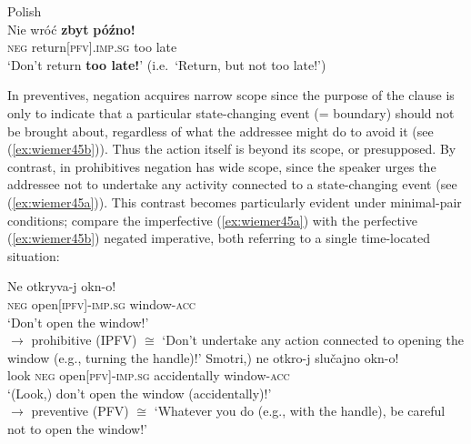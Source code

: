 \documentclass[output=paper,colorlinks,citecolor=brown]{langscibook}
\begin{document}
\ea \textnormal{Polish} \\
\label{ex:wiemer44}
\gll Nie wróć \textbf{zbyt} \textbf{późno!} \\
\textsc{neg} return\textsc{[pfv].imp.sg} too late \\
\glt `Don't return \textbf{too late!}' (i.e.\ `Return, but not too late!')
\z


 In preventives, negation acquires narrow scope since the purpose of the clause is only to indicate that a particular state-changing event (= boundary) should not be brought about, regardless of what the addressee might do to avoid it (see (\ref{ex:wiemer45b})). Thus the action itself is beyond its scope, or presupposed. By contrast, in prohibitives negation has wide scope, since the speaker urges the addressee not to undertake any activity connected to a state-changing event (see (\ref{ex:wiemer45a})). This contrast becomes particularly evident under minimal-pair conditions; compare the imperfective (\ref{ex:wiemer45a}) with the perfective (\ref{ex:wiemer45b}) negated imperative, both referring to a single time-located situation:



\ea \textnormal{}
\label{ex:wiemer45} 
\ea \label{ex:wiemer45a}
\gll Ne otkryva-j okn-o! \\
\textsc{neg} open\textsc{[ipfv]-imp.sg} window-\textsc{acc} \\
\glt `Don't open the window!' \\
$\rightarrow$ prohibitive (IPFV) ${\cong}$ `Don't undertake any action connected to opening the window (e.g., turning the handle)!'
\ex \label{ex:wiemer45b}
\gll {\op}Smotri\textnormal{,)} ne otkro-j {\op}slučajno{\cp} okn-o! \\
look \textsc{neg} open\textsc{[pfv]-imp.sg} accidentally window-\textsc{acc} \\
\glt `(Look,) don't open the window (accidentally)!' \\
$\rightarrow$ preventive (PFV) ${\cong}$ `Whatever you do (e.g., with the handle), be careful not to open the window!'
\z
\z
\end{document}
